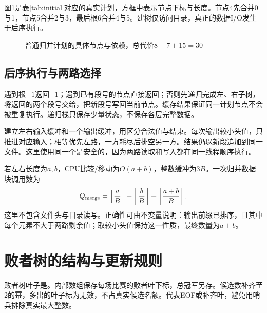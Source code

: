 图\ref{fig:binary-tree}是表\ref{tab:initial}对应的真实计划，方框中表示节点下标与长度。节点4先合并0与1，节点5合并2与3，最后根6合并4与5。建树仅访问目录，真正的数据I/O发生于后序执行。

\begin{figure}[htbp]\centering
{}\caption{普通归并计划的具体节点与依赖，总代价$8+7+15=30$}\label{fig:binary-tree}\end{figure}

\subsection{后序执行与两路选择}
遇到根$-1$返回$-1$；遇到已有段号的节点直接返回；否则先递归完成左、右子树，将返回的两个段号交给，把新段号写回当前节点。缓存结果保证同一计划节点不会被重复执行。递归栈只保存少量状态，不保存各层完整数据。

建立左右输入缓冲和一个输出缓冲，用区分合法值与结束。每次输出较小头值，只推进对应输入；相等优先左路，一方耗尽后排空另一方。结果仍以新段追加到同一文件。这里使用同一个是安全的，因为两路读取和写入都在同一线程顺序执行。

若左右长度为$a,b$，CPU比较/移动为$O(a+b)$，整数缓冲为$3B$。一次归并数据块调用数为
\begin{equation}
Q_{\rm merge}=\left\lceil\frac{a}{B}\right\rceil+\left\lceil\frac{b}{B}\right\rceil+\left\lceil\frac{a+b}{B}\right\rceil.
\end{equation}
这里不包含文件头与目录读写。正确性可由不变量说明：输出前缀已排序，且其中每个元素不大于两路剩余值；取较小头值保持这一性质，最终数量为$a+b$。

\section{败者树的结构与更新规则}
败者树叶子是。内部数组保存每场比赛的败者叶下标，总冠军另存。候选数补齐至2的幂，多出的叶子标为无效，不占真实候选名额。代表EOF或补齐叶，避免用哨兵排除真实最大整数。

